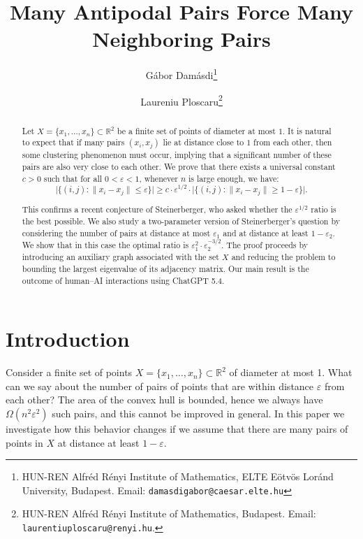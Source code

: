 \documentclass[12pt]{article}
\title{Many Antipodal Pairs Force Many Neighboring Pairs}
\date{}
\author{G\'abor Dam\'asdi\thanks{HUN-REN Alfr\'ed R\'enyi Institute of Mathematics, ELTE Eötvös Loránd University, Budapest. Email: \texttt{damasdigabor@caesar.elte.hu}} \and Lauren\cb{t}iu Ploscaru\thanks{HUN-REN Alfr\'ed R\'enyi Institute of Mathematics, Budapest. Email: \texttt{laurentiuploscaru@renyi.hu}.
}}
\newcommand{\eps}{\varepsilon}
\newcommand{\R}{\mathbb R}
\begin{document}
\maketitle

\begin{abstract}
	  Let $X=\{x_1,\dots,x_n\}\subset \R^2$ be a finite set of points of diameter at most $1$. It is natural to expect that if many pairs $(x_i,x_j)$ lie at distance close to $1$ from each other, then some clustering phenomenon must occur, implying that a significant number of these pairs are also very close to each other. %
      We prove that there exists a universal constant $c>0$ such that for all $0<\eps<1$, whenever $n$ is large enough, we have: 
\[
\big|\{(i,j):\|x_i-x_j\|\le \eps\}\big|
\ge c\cdot \eps^{1/2}\cdot
\big|\{(i,j):\|x_i-x_j\|\ge 1-\eps\}\big|.
\]

This confirms a recent conjecture of Steinerberger, who asked whether the $\eps^{1/2}$ ratio is the best possible. We also study a two-parameter version of Steinerberger's question by considering the number of pairs at distance at most $\eps_1$ and at distance at least $1-\eps_2$. We show that in this case the optimal ratio is $\eps_1^2\cdot\eps_2^{-3/2}$. The proof proceeds by introducing an auxiliary graph associated with the set $X$ and reducing the problem to bounding the largest eigenvalue of its adjacency matrix. Our main result is the outcome of human--AI interactions using ChatGPT 5.4. 
      
\end{abstract}


\section{Introduction}

 Consider a finite set of points  $X=\{x_1,\dots,x_n\}\subset \R^2$ of diameter at most 1. What can we say about the number of pairs of points that are within distance $\varepsilon$ from each other? The area of the convex hull is bounded, hence we always have  $\Omega(n^2\varepsilon^{2})$ such pairs, and this cannot be improved in general. In this paper we investigate how this behavior changes if we assume that there are many pairs of points in $X$ at distance at least $1-\varepsilon$. 
\end{document}
